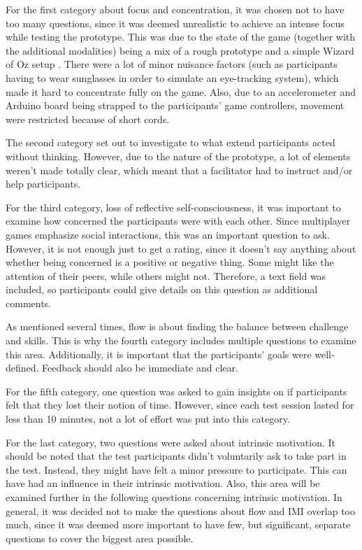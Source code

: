 For the first category about focus and concentration, it was chosen not to have too many questions, since it was deemed unrealistic to achieve an intense focus while testing the prototype. This was due to the state of the game (together with the additional modalities) being a mix of a rough prototype and a simple Wizard of Oz setup \citep{InteractDesign}. There were a lot of minor nuisance factors (such as participants having to wear sunglasses in order to simulate an eye-tracking system), which made it hard to concentrate fully on the game. Also, due to an accelerometer and Arduino board being strapped to the participants' game controllers, movement were restricted because of short cords.

The second category set out to investigate to what extend participants acted without thinking. However, due to the nature of the prototype, a lot of elements weren't made totally clear, which meant that a facilitator had to instruct and/or help participants.

For the third category, loss of reflective self-consciousness, it was important to examine how concerned the participants were with each other. Since multiplayer games emphasize social interactions, this was an important question to ask. However, it is not enough just to get a rating, since it doesn't say anything about whether being concerned is a positive or negative thing. Some might like the attention of their peers, while others might not. Therefore, a text field was included, so participants could give details on this question as additional comments.

As mentioned several times, flow is about finding the balance between challenge and skills. This is why the fourth category includes multiple questions to examine this area. Additionally, it is important that the participants' goals were well-defined. Feedback should also be immediate and clear.

For the fifth category, one question was asked to gain insights on if participants felt that they lost their notion of time. However, since each test session lasted for less than 10 minutes, not a lot of effort was put into this category.

For the last category, two questions were asked about intrinsic motivation. It should be noted that the test participants didn't voluntarily ask to take part in the test. Instead, they might have felt a minor pressure to participate. This can have had an influence in their intrinsic motivation. Also, this area will be examined further in the following questions concerning intrinsic motivation. In general, it was decided not to make the questions about flow and IMI overlap too much, since it was deemed more important to have few, but significant, separate questions to cover the biggest area possible.

